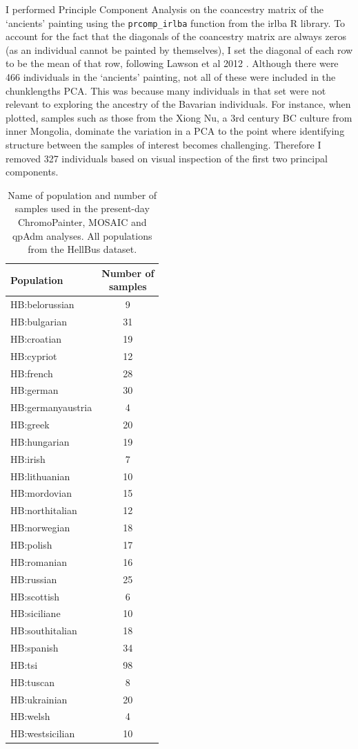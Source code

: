 I performed Principle Component Analysis on the coancestry matrix of the `ancients' painting using the \texttt{prcomp\_irlba} function from the irlba R library. To account for the fact that the diagonals of the coancestry matrix are always zeros (as an individual cannot be painted by themselves), I set the diagonal of each row to be the mean of that row, following Lawson et al 2012 \cite{Lawson2012}. Although there were 466 individuals in the `ancients' painting, not all of these were included in the chunklengths PCA. This was because many individuals in that set were not relevant to exploring the ancestry of the Bavarian individuals. For instance, when plotted, samples such as those from the Xiong Nu, a 3rd century BC culture from inner Mongolia, dominate the variation in a PCA to the point where identifying structure between the samples of interest becomes challenging. Therefore I removed 327 individuals based on visual inspection of the first two principal components.

\begin{table}
\centering
\begin{tabular}[t]{lc}
\toprule
Population & \thead{Number of\\samples}\\
\midrule
HB:belorussian & 9\\
HB:bulgarian & 31\\
HB:croatian & 19\\
HB:cypriot & 12\\
HB:french & 28\\
HB:german & 30\\
HB:germanyaustria & 4\\
HB:greek & 20\\
HB:hungarian & 19\\
HB:irish & 7\\
HB:lithuanian & 10\\
HB:mordovian & 15\\
HB:northitalian & 12\\
HB:norwegian & 18\\
HB:polish & 17\\
HB:romanian & 16\\
HB:russian & 25\\
HB:scottish & 6\\
HB:siciliane & 10\\
HB:southitalian & 18\\
HB:spanish & 34\\
HB:tsi & 98\\
HB:tuscan & 8\\
HB:ukrainian & 20\\
HB:welsh & 4\\
HB:westsicilian & 10\\
\bottomrule
\end{tabular}
\caption{Name of population and number of samples used in the present-day ChromoPainter, MOSAIC and qpAdm analyses. All populations from the HellBus dataset.}
\label{tab:BavariaModernSamples}
\end{table}

